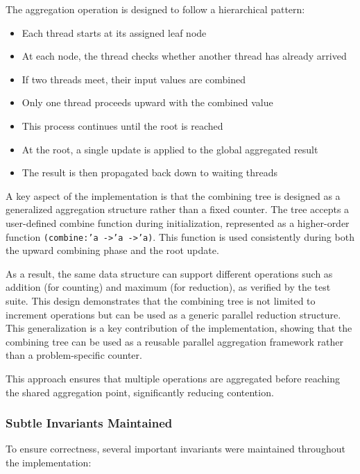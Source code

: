 \documentclass[11pt,a4paper]{article}
\begin{document}
The aggregation operation is designed to follow a hierarchical pattern:

\begin{itemize}
    \item Each thread starts at its assigned leaf node
    \item At each node, the thread checks whether another thread has already arrived
    \item If two threads meet, their input values are combined
    \item Only one thread proceeds upward with the combined value
    \item This process continues until the root is reached
    \item At the root, a single update is applied to the global aggregated result
    \item The result is then propagated back down to waiting threads
\end{itemize}

A key aspect of the implementation is that the combining tree is designed as a generalized aggregation structure rather than a fixed counter. The tree accepts a user-defined combine function during initialization, represented as a higher-order function \texttt{(combine:'a ->'a ->'a)}. This function is used consistently during both the upward combining phase and the root update.

As a result, the same data structure can support different operations such as addition (for counting) and maximum (for reduction), as verified by the test suite. This design demonstrates that the combining tree is not limited to increment operations but can be used as a generic parallel reduction structure. This generalization is a key contribution of the implementation, showing that the combining tree can be used as a reusable parallel aggregation framework rather than a problem-specific counter.

This approach ensures that multiple operations are aggregated before reaching the shared aggregation point, significantly reducing contention.

\subsubsection*{Subtle Invariants Maintained}

To ensure correctness, several important invariants were maintained throughout the implementation:
\end{document}
